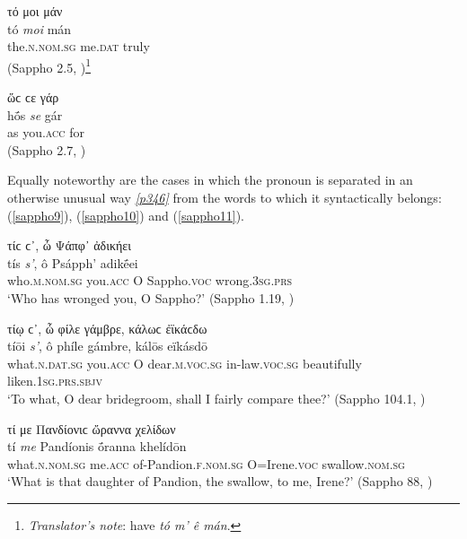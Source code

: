 \begin{exe}
\ex τό {μοι} μάν\\
\gll tó \emph{moi} mán\\
the.\textsc{n.nom.sg} me.\textsc{dat} truly\\
\trans (Sappho 2.5, \citealp[31.5]{LobelPage1968})\footnote{\emph{Translator's note}: \citet[31.5]{LobelPage1968} have \textit{tó m' ê mán}.}
\label{sappho7}
\end{exe}

\begin{exe}
\ex ὥϲ {ϲε} γάρ\\
\gll hṓs \emph{se} gár\\
as you.\textsc{acc} for\\
\trans (Sappho 2.7, \citealp[31.7]{LobelPage1968})
\label{sappho8}
\end{exe}

Equally noteworthy are the cases in which the pronoun is separated in an otherwise unusual way \hyperlink{p346}{\emph{[p346]}} from the words to which it syntactically belongs: (\ref{sappho9}), (\ref{sappho10}) and (\ref{sappho11}).

\begin{exe}
\ex τίϲ ϲ᾽, ὦ Ψάπφ᾽ ἀδικήει\\
\gll tís \emph{s'}, ô Psápph' adikḗei\\
who.\textsc{m.nom.sg} you.\textsc{acc} O Sappho.\textsc{voc} wrong.\textsc{3sg.prs}\\
\trans `Who has wronged you, O Sappho?' (Sappho 1.19, \citealp[1.19]{LobelPage1968})
\label{sappho9}
\end{exe}

\begin{exe}
\ex τίῳ ϲ᾽, ὦ φίλε γάμβρε, κάλωϲ ἐϊκάϲδω\\
\gll tíōi \emph{s'}, ô phíle gámbre, kálōs eïkásdō\\
what.\textsc{n.dat.sg} you.\textsc{acc} O dear.\textsc{m.voc.sg} in-law.\textsc{voc.sg} beautifully liken.\textsc{1sg.prs.sbjv}\\
\trans `To what, O dear bridegroom, shall I fairly compare thee?' (Sappho 104.1, \citealp[115.1]{LobelPage1968})
\label{sappho10}
\end{exe}

\begin{exe}
\ex τί {με} Πανδίονιϲ ὤραννα χελίδων\\
\gll tí \emph{me} Pandíonis ṓranna khelídōn\\
what.\textsc{n.nom.sg} me.\textsc{acc} of-Pandion.\textsc{f.nom.sg} O=Irene.\textsc{voc} swallow.\textsc{nom.sg}\\
\trans `What is that daughter of Pandion, the swallow, to me, Irene?' (Sappho 88, \citealp[135.1]{LobelPage1968})
\label{sappho11}
\end{exe}

